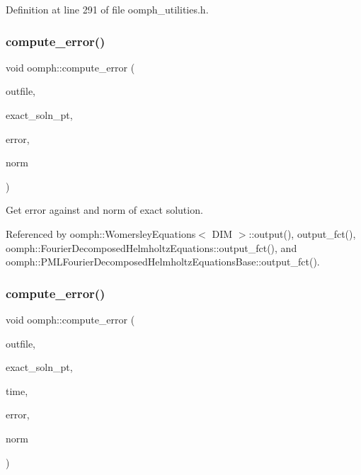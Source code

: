 Definition at line 291 of file oomph\+\_\+utilities.\+h.

\mbox{\label{namespaceoomph_ae99ee82405593cbf515785fa2116ec2a}} 
\subsubsection{\texorpdfstring{compute\+\_\+error()}{compute\_error()}\hspace{0.1cm}{\footnotesize\ttfamily [1/2]}}
{\footnotesize\ttfamily void oomph\+::compute\+\_\+error (\begin{DoxyParamCaption}\item[{std\+::ostream \&}]{outfile,  }\item[{\hyperlink{classoomph_1_1FiniteElement_a690fd33af26cc3e84f39bba6d5a85202}{Finite\+Element\+::\+Steady\+Exact\+Solution\+Fct\+Pt}}]{exact\+\_\+soln\+\_\+pt,  }\item[{double \&}]{error,  }\item[{double \&}]{norm }\end{DoxyParamCaption})}



Get error against and norm of exact solution. 



Referenced by oomph\+::\+Womersley\+Equations$<$ D\+I\+M $>$\+::output(), output\+\_\+fct(), oomph\+::\+Fourier\+Decomposed\+Helmholtz\+Equations\+::output\+\_\+fct(), and oomph\+::\+P\+M\+L\+Fourier\+Decomposed\+Helmholtz\+Equations\+Base\+::output\+\_\+fct().

\mbox{\label{namespaceoomph_ac84166e8fd13dcb55670244c618a2bab}} 
\subsubsection{\texorpdfstring{compute\+\_\+error()}{compute\_error()}\hspace{0.1cm}{\footnotesize\ttfamily [2/2]}}
{\footnotesize\ttfamily void oomph\+::compute\+\_\+error (\begin{DoxyParamCaption}\item[{std\+::ostream \&}]{outfile,  }\item[{\hyperlink{classoomph_1_1FiniteElement_ad4ecf2b61b158a4b4d351a60d23c633e}{Finite\+Element\+::\+Unsteady\+Exact\+Solution\+Fct\+Pt}}]{exact\+\_\+soln\+\_\+pt,  }\item[{const double \&}]{time,  }\item[{double \&}]{error,  }\item[{double \&}]{norm }\end{DoxyParamCaption})}




